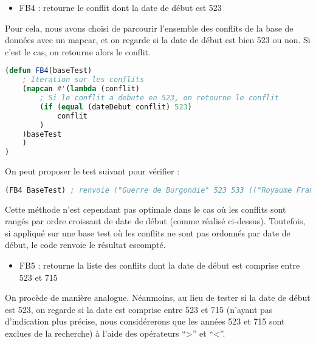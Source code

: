\documentclass[a4paper, 12pt]{article}
\begin{document}
\begin{itemize}[label=\textbullet]
\item FB4 : retourne le conflit dont la date de début est 523
\end{itemize}
\vspace{3mm}

Pour cela, nous avons choisi de parcourir l’ensemble des conflits de la base de données avec un mapcar, et on regarde si la date de début est bien 523 ou non. Si c’est le cas, on retourne alors le conflit.
\vspace{2mm}

\begin{lstlisting}[language=Lisp]
(defun FB4(baseTest)
    ; Iteration sur les conflits
    (mapcan #'(lambda (conflit)
        ; Si le conflit a debute en 523, on retourne le conflit
        (if (equal (dateDebut conflit) 523)
            conflit
        )
    )baseTest
    )
)
\end{lstlisting}
\vspace{2mm}

On peut proposer le test suivant pour vérifier :
\vspace{2mm}

\begin{lstlisting}[language=Lisp]
(FB4 BaseTest) ; renvoie ("Guerre de Burgondie" 523 533 (("Royaume Franc") ("Royaume des Burgondes")) ("Vezeronce" "Arles"))
\end{lstlisting}
\vspace{2mm}

Cette méthode n’est cependant pas optimale dans le cas où les conflits sont rangés par ordre croissant de date de début (comme réalisé ci-dessus). Toutefois, si appliqué sur une base test où les conflits ne sont pas ordonnés par date de début, le code renvoie le résultat escompté.
\vspace{5mm}

\begin{itemize}[label=\textbullet]
\item FB5 : retourne la liste des conflits dont la date de début est comprise entre 523 et 715
\end{itemize}
\vspace{3mm}

On procède de manière analogue. Néanmoins, au lieu de tester si la date de début est 523, on regarde si la date est comprise entre 523 et 715 (n’ayant pas d’indication plus précise, nous considérerons que les années 523 et 715 sont exclues de la recherche) à l’aide des opérateurs “>” et “<”.
\vspace{2mm}
\end{document}
